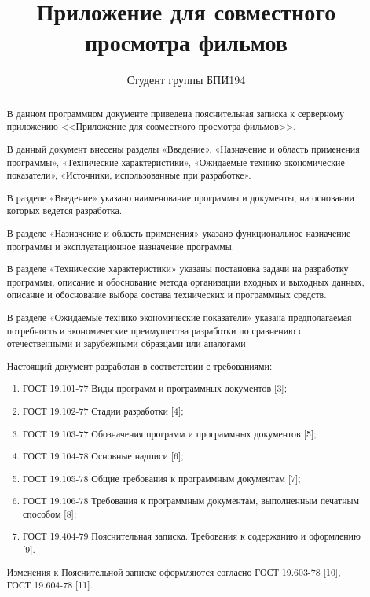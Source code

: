 \documentclass{../includes/TechDoc}
\title{Приложение для совместного просмотра фильмов}
\author{Студент группы БПИ194}{В. А. Анненков}
\begin{document}
    \maketitle

    \begin{abstract}
        В данном программном документе приведена пояснительная записка к серверному приложению <<Приложение для совместного просмотра фильмов>>.

        В данный документ внесены разделы «Введение», «Назначение и область применения программы», «Технические характеристики», «Ожидаемые технико-экономические показатели», «Источники, использованные при разработке».

        В разделе «Введение» указано наименование программы и документы, на основании которых ведется разработка.

        В разделе «Назначение и область применения» указано функциональное назначение программы и эксплуатационное назначение программы.

        В разделе «Технические характеристики» указаны постановка задачи на разработку программы, описание и обоснование метода организации входных и выходных данных, описание и обоснование выбора состава технических и программных средств.

        В разделе «Ожидаемые технико-экономические показатели» указана предполагаемая потребность и экономические преимущества разработки по сравнению с отечественными и зарубежными образцами или аналогами

        Настоящий документ разработан в соответствии с требованиями:
        \begin{enumerate}
            \item ГОСТ 19.101-77 Виды программ и программных документов [3];
            \item ГОСТ 19.102-77 Стадии разработки [4];
            \item ГОСТ 19.103-77 Обозначения программ и программных документов [5];
            \item ГОСТ 19.104-78 Основные надписи [6];
            \item ГОСТ 19.105-78 Общие требования к программным документам [7];
            \item ГОСТ 19.106-78 Требования к программным документам, выполненным печатным способом [8];
            \item ГОСТ 19.404-79 Пояснительная записка.
            Требования к содержанию и оформлению [9].
        \end{enumerate}
        Изменения к Пояснительной записке оформляются согласно ГОСТ 19.603-78 [10], ГОСТ 19.604-78 [11].
    \end{abstract}
\end{document}
